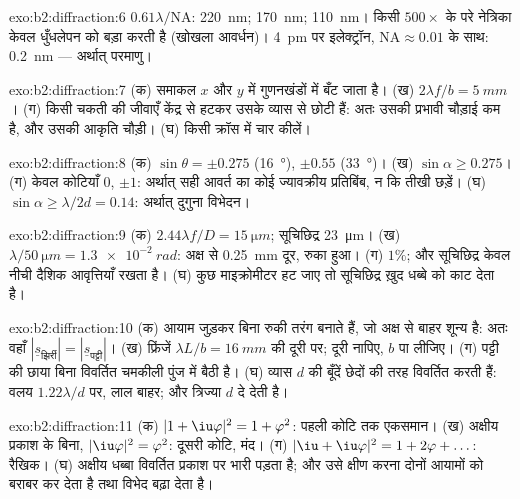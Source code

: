 \begin{solution}{exo:b2:diffraction:6}
$0.61\lambda/\mathrm{NA}$: \qty{220}{nm}; \qty{170}{nm}; \qty{110}{nm}। किसी $500\times$ के परे
नेत्रिका केवल धुँधलेपन को बड़ा करती है (खोखला आवर्धन)। \qty{4}{pm} पर
इलेक्ट्रॉन, $\mathrm{NA} \approx 0.01$ के साथ: \qty{0.2}{nm} --- अर्थात् परमाणु।
\end{solution}

\begin{solution}{exo:b2:diffraction:7}
(क) समाकल $x$ और $y$ में गुणनखंडों में बँट जाता है। (ख) $2\lambda f/b = \qty{5}{mm}$। (ग) किसी
चकती की जीवाएँ केंद्र से हटकर उसके व्यास से छोटी हैं: अतः उसकी
प्रभावी चौड़ाई कम है, और उसकी आकृति चौड़ी। (घ) किसी क्रॉस में चार 
कीलें।
\end{solution}

\begin{solution}{exo:b2:diffraction:8}
(क) $\sin\theta = \pm0.275$ (\qty{16}{\degree}), $\pm0.55$ (\qty{33}{\degree})। (ख) $\sin\alpha \ge 0.275$।
(ग) केवल कोटियाँ $0$, $\pm1$: अर्थात् सही आवर्त का कोई ज्यावक्रीय प्रतिबिंब, न कि
तीखी छड़ें। (घ) $\sin\alpha \ge \lambda/2d = 0.14$: अर्थात् दुगुना विभेदन।
\end{solution}

\begin{solution}{exo:b2:diffraction:9}
(क) $2.44\lambda f/D = \qty{15}{\micro m}$; सूचिछिद्र \qty{23}{\micro m}। (ख) $\lambda/\qty{50}{\micro m} =
\qty{1.3e-2}{rad}$: अक्ष से \qty{0.25}{mm} दूर, रुका हुआ। (ग) $1\%$; और सूचिछिद्र केवल
नीची दैशिक आवृत्तियाँ रखता है। (घ) कुछ माइक्रोमीटर हट जाए तो
सूचिछिद्र ख़ुद धब्बे को काट देता है।
\end{solution}

\begin{solution}{exo:b2:diffraction:10}
(क) आयाम जुड़कर बिना रुकी तरंग बनाते हैं, जो अक्ष से बाहर शून्य है:
अतः वहाँ $|\underline s_{\text{झिर्री}}| = |\underline s_{\text{पट्टी}}|$। (ख) फ्रिंजें $\lambda L/b =
\qty{16}{mm}$ की दूरी पर; दूरी नापिए, $b$ पा लीजिए। (ग) पट्टी की छाया
बिना विवर्तित चमकीली पुंज में बैठी है। (घ) व्यास $d$ की बूँदें छेदों की तरह
विवर्तित करती हैं: वलय $1.22\lambda/d$ पर, लाल बाहर; और त्रिज्या $d$ दे देती है।
\end{solution}

\begin{solution}{exo:b2:diffraction:11}
(क) $|1 + \iu\varphi|^2 = 1 + \varphi^2$: पहली कोटि तक एकसमान। (ख) अक्षीय प्रकाश के
बिना, $|\iu\varphi|^2 = \varphi^2$: दूसरी कोटि, मंद। (ग) $|\iu + \iu\varphi|^2 =
1 + 2\varphi + \dots$: रैखिक। (घ) अक्षीय धब्बा विवर्तित प्रकाश पर भारी पड़ता
है; और उसे क्षीण करना दोनों आयामों को बराबर कर देता है तथा विभेद बढ़ा देता है।
\end{solution}

